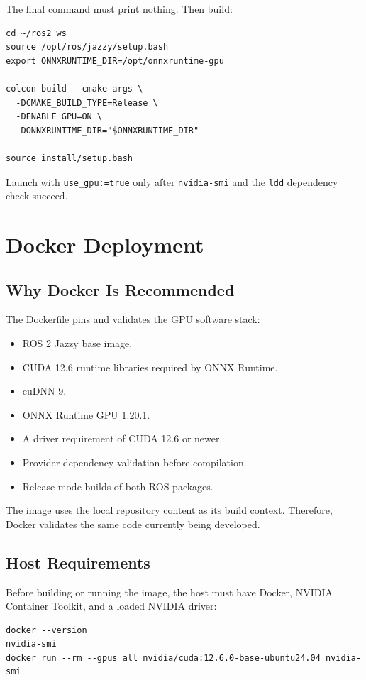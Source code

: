 \documentclass[11pt,a4paper]{article}
\begin{document}
The final command must print nothing. Then build:

\begin{lstlisting}
cd ~/ros2_ws
source /opt/ros/jazzy/setup.bash
export ONNXRUNTIME_DIR=/opt/onnxruntime-gpu

colcon build --cmake-args \
  -DCMAKE_BUILD_TYPE=Release \
  -DENABLE_GPU=ON \
  -DONNXRUNTIME_DIR="$ONNXRUNTIME_DIR"

source install/setup.bash
\end{lstlisting}

Launch with \texttt{use\_gpu:=true} only after \texttt{nvidia-smi} and the \texttt{ldd} dependency check succeed.

\section{Docker Deployment}

\subsection{Why Docker Is Recommended}

The Dockerfile pins and validates the GPU software stack:

\begin{itemize}
  \item ROS 2 Jazzy base image.
  \item CUDA 12.6 runtime libraries required by ONNX Runtime.
  \item cuDNN 9.
  \item ONNX Runtime GPU 1.20.1.
  \item A driver requirement of CUDA 12.6 or newer.
  \item Provider dependency validation before compilation.
  \item Release-mode builds of both ROS packages.
\end{itemize}

The image uses the local repository content as its build context. Therefore, Docker validates the same code currently being developed.

\subsection{Host Requirements}

Before building or running the image, the host must have Docker, NVIDIA Container Toolkit, and a loaded NVIDIA driver:

\begin{lstlisting}
docker --version
nvidia-smi
docker run --rm --gpus all nvidia/cuda:12.6.0-base-ubuntu24.04 nvidia-smi
\end{lstlisting}
\end{document}
